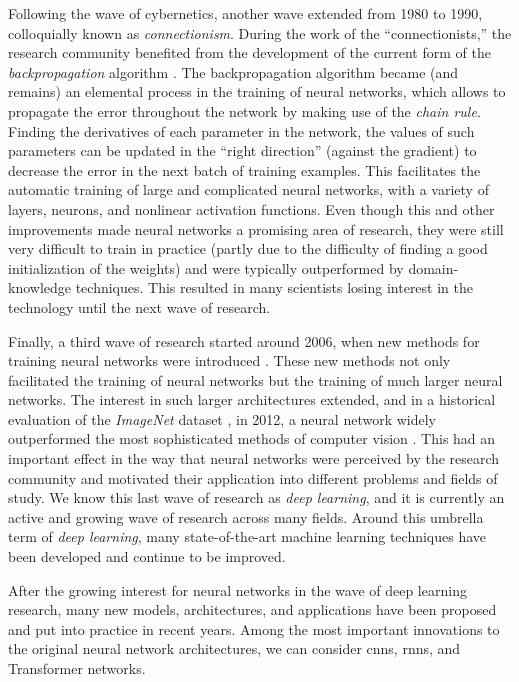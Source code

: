 Following the wave of cybernetics, another wave extended
from 1980 to 1990, colloquially known as
\emph{connectionism}. During the work of the
``connectionists,'' the research community benefited
from the development of the current form of the
\emph{backpropagation} algorithm
\parencite{rumelhart1988learning}. The backpropagation
algorithm became (and remains) an elemental process in the
training of neural networks, which allows to propagate the
error throughout the network by making use of the
\emph{chain rule}. Finding the derivatives of each parameter
in the network, the values of such parameters can be updated
in the ``right direction'' (against the gradient) to
decrease the error in the next batch of training examples.
This facilitates the automatic training of large and
complicated neural networks, with a variety of layers,
neurons, and nonlinear activation functions. Even though
this and other improvements made neural networks a promising
area of research, they were still very difficult to train in
practice (partly due to the difficulty of finding a good
initialization of the weights) and were typically
outperformed by domain-knowledge techniques. This resulted
in many scientists losing interest in the technology until the next wave of research.

Finally, a third wave of research started around 2006, when
new methods for training neural networks were introduced
\parencite{hinton2006fast}. These new methods not only
facilitated the training of neural networks but the training
of much larger neural networks. The interest in such larger
architectures extended, and in a historical evaluation of
the \emph{ImageNet} dataset \parencite{deng2009imagenet}, in
2012, a neural network widely outperformed the most
sophisticated methods of computer vision
\parencite{krizhevsky2012imagenet}. This had an important
effect in the way that neural networks were perceived by the
research community and motivated their application into
different problems and fields of study. We know this last
wave of research as \emph{deep learning}, and it is
currently an active and growing wave of research across many
fields. Around this umbrella term of \emph{deep learning},
many state-of-the-art machine learning techniques have been
developed and continue to be improved.

 After the growing
interest for neural networks in the wave of deep learning
research, many new models, architectures, and applications
have been proposed and put into practice in recent years.
Among the most important innovations to the original neural
network architectures, we can consider \glspl{cnn},
\glspl{rnn}, and Transformer networks.

